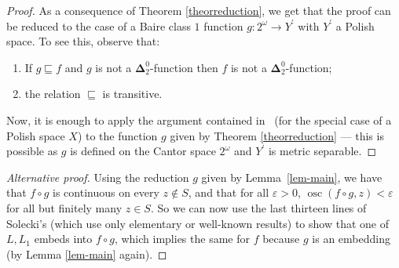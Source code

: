\documentclass{raex}
\theoremstyle{plain}
\theoremstyle{definition}
\theoremstyle{remark}
\def\D{\mathbf{\Delta}}
\def\osc{\operatorname{osc}}
\begin{document}
\begin{proof}
As a consequence of Theorem \ref{theorreduction}, we get that the proof can be reduced to the case of a Baire class $1$ function $g \colon 2^\omega \to Y^\prime$ with $Y^\prime$ a Polish space. To see this, observe that:
\begin{enumerate}
\item If $g \sqsubseteq f$ and $g$ is not a $\D^0_2$-function then $f$ is not a $\D^0_2$-function;
\item the relation $\sqsubseteq$ is transitive.
\end{enumerate}
Now, it is enough to apply the argument contained in~\cite[Proof of Theorem 3.1]{sol} (for the special case of a Polish space $X$) to the function $g$ given by Theorem \ref{theorreduction} --- this is possible as $g$ is defined on the Cantor space $2^\omega$ and $Y^\prime$ is metric separable.
\end{proof}

\begin{proof}[Alternative proof]
Using the reduction $g$ given by Lemma~\ref{lem-main}, we have that $f \circ g$ is continuous on every $z \notin S$, and that for all $\varepsilon>0$, $\osc(f\circ g,z)< \varepsilon$ for all but finitely many $z \in S$. So we can now use the last thirteen lines of Solecki's \cite[Proof of Theorem~3.1]{sol} (which use only elementary or well-known results) to show that one of $L,L_1$ embeds into $f \circ g$, which implies the same for $f$ because $g$ is an embedding (by Lemma \ref{lem-main} again).
\end{proof}
\end{document}
